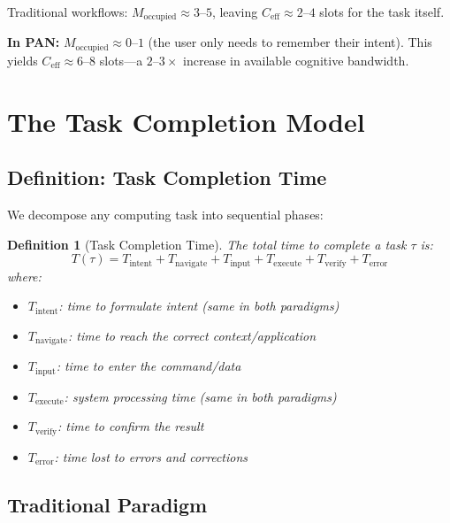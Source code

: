 \documentclass[11pt, a4paper]{article}
\newtheorem{definition}{Definition}
\begin{document}
Traditional workflows: $M_{\text{occupied}} \approx 3\text{--}5$, leaving
$C_{\text{eff}} \approx 2\text{--}4$ slots for the task itself.

\textbf{In PAN:} $M_{\text{occupied}} \approx 0\text{--}1$ (the user only needs
to remember their intent). This yields $C_{\text{eff}} \approx 6\text{--}8$
slots---a $2\text{--}3\times$ increase in available cognitive bandwidth.

\section{The Task Completion Model}

\subsection{Definition: Task Completion Time}

We decompose any computing task into sequential phases:

\begin{definition}[Task Completion Time]
The total time to complete a task $\tau$ is:
\begin{equation}
  T(\tau) = T_{\text{intent}} + T_{\text{navigate}} + T_{\text{input}} + T_{\text{execute}} + T_{\text{verify}} + T_{\text{error}}
  \label{eq:task}
\end{equation}
where:
\begin{itemize}[noitemsep]
  \item $T_{\text{intent}}$: time to formulate intent (same in both paradigms)
  \item $T_{\text{navigate}}$: time to reach the correct context/application
  \item $T_{\text{input}}$: time to enter the command/data
  \item $T_{\text{execute}}$: system processing time (same in both paradigms)
  \item $T_{\text{verify}}$: time to confirm the result
  \item $T_{\text{error}}$: time lost to errors and corrections
\end{itemize}
\end{definition}

\subsection{Traditional Paradigm}
\end{document}
